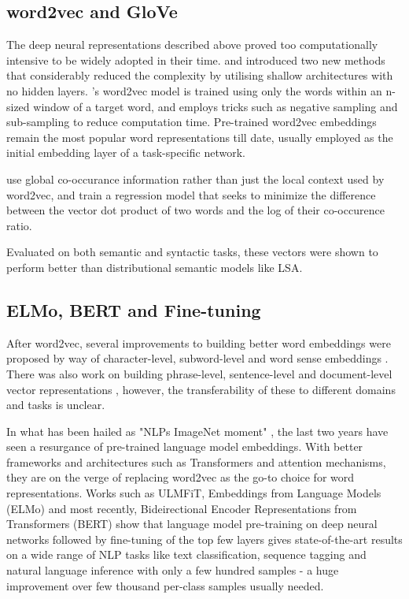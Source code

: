 \documentclass[12pt]{report}
\begin{document}
	\subsection{word2vec and GloVe}
	The deep neural representations described above proved too computationally intensive to be widely adopted in their time. \citep{mikolov2013distributed} and \citep{pennington2014glove} introduced two new methods that considerably reduced the complexity by utilising shallow architectures with no hidden layers. \citep{mikolov2013distributed}'s word2vec model is trained using only the words within an n-sized window of a target word, and employs tricks such as negative sampling and sub-sampling to reduce computation time. Pre-trained word2vec embeddings remain the most popular word representations till date, usually employed as the initial embedding layer of a task-specific network. 
	\par \citep{pennington2014glove} use global co-occurance information rather than just the local context used by word2vec, and train a regression model that seeks to minimize the difference between the vector dot product of two words and the log of their co-occurence ratio. 
	\par Evaluated on both semantic and syntactic tasks, these vectors were shown to perform better than distributional semantic models like LSA. 
	
	\subsection{ELMo, BERT and Fine-tuning}
	After word2vec, several improvements to building better word embeddings were proposed by way of character-level, subword-level and word sense embeddings \citep{santos2014learning} \citep{bojanowski2017enriching} \citep{trask2015sense2vec}. There was also work on building phrase-level, sentence-level and document-level vector representations \citep{li2015hierarchical}, however, the transferability of these  to different domains and tasks is unclear. 
	\par In what has been hailed as "NLPs ImageNet moment" \citep{NLPImage:2018}, the last two years have seen a resurgance of pre-trained language model embeddings. With better frameworks and architectures such as Transformers and attention mechanisms, they are on the verge of replacing word2vec as the go-to choice for word representations. Works such as ULMFiT, Embeddings from Language Models (ELMo) \citep{peters2018deep} and most recently, Bideirectional Encoder Representations from Transformers (BERT) \citep{devlin2018bert} show that language model pre-training on deep neural networks followed by fine-tuning of the top few layers gives state-of-the-art results on a wide range of NLP tasks like text classification, sequence tagging and natural language inference with only a few hundred samples -  a huge improvement over few thousand per-class samples usually needed.
	
\end{document}
